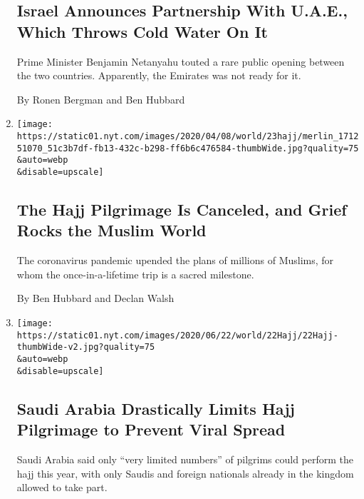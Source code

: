\begin{enumerate}
  \hypertarget{israel-announces-partnership-with-uae-which-throws-cold-water-on-it}{%
  \subsection{Israel Announces Partnership With U.A.E., Which Throws
  Cold Water On
  It}\label{israel-announces-partnership-with-uae-which-throws-cold-water-on-it}}

  Prime Minister Benjamin Netanyahu touted a rare public opening between
  the two countries. Apparently, the Emirates was not ready for it.

  By Ronen Bergman and Ben Hubbard
\item
  \href{/2020/06/23/world/middleeast/hajj-pilgrimage-canceled.html}{}

  \texttt{[image: https://static01.nyt.com/images/2020/04/08/world/23hajj/merlin\_171251070\_51c3b7df-fb13-432c-b298-ff6b6c476584-thumbWide.jpg?quality=75\\\&auto=webp\\\&disable=upscale]}

  \hypertarget{the-hajj-pilgrimage-is-canceled-and-grief-rocks-the-muslim-world}{%
  \subsection{The Hajj Pilgrimage Is Canceled, and Grief Rocks the
  Muslim
  World}\label{the-hajj-pilgrimage-is-canceled-and-grief-rocks-the-muslim-world}}

  The coronavirus pandemic upended the plans of millions of Muslims, for
  whom the once-in-a-lifetime trip is a sacred milestone.

  By Ben Hubbard and Declan Walsh
\item
  \href{/2020/06/22/world/middleeast/saudi-arabia-hajj-mecca-pilgrims.html}{}

  \texttt{[image: https://static01.nyt.com/images/2020/06/22/world/22Hajj/22Hajj-thumbWide-v2.jpg?quality=75\\\&auto=webp\\\&disable=upscale]}

  \hypertarget{saudi-arabia-drastically-limits-hajj-pilgrimage-to-prevent-viral-spread}{%
  \subsection{Saudi Arabia Drastically Limits Hajj Pilgrimage to Prevent
  Viral
  Spread}\label{saudi-arabia-drastically-limits-hajj-pilgrimage-to-prevent-viral-spread}}

  Saudi Arabia said only ``very limited numbers'' of pilgrims could
  perform the hajj this year, with only Saudis and foreign nationals
  already in the kingdom allowed to take part.


\end{enumerate}
